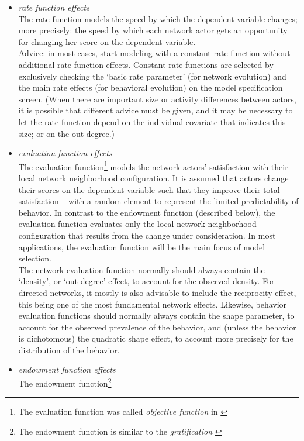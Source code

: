\documentclass[a4paper,fleqn]{article}
\newcommand{\+}{\, + \,}
\begin{document}
{\begin{itemize}
\item {\em rate function effects}\\
The rate function models the speed by which the dependent variable
changes; more precisely: the speed by which each network actor
gets an opportunity for changing her score on the dependent
variable.\\
Advice: in most cases, start modeling with a constant rate function without
additional rate function effects. Constant rate functions are
selected by exclusively checking the `basic rate parameter' (for
network evolution) and the main rate effects (for behavioral
evolution) on the {\sf model specification} screen.
(When there are important size or activity differences between
actors, it is possible that different advice must be given,
and it may be necessary to let the rate function
depend on the individual covariate that indicates this size;
or on the out-degree.)
\item {\em evaluation function effects}\\
The evaluation function\footnote{The evaluation function was called
\emph{objective function} in \citet{Snijders01}} models the network actors' satisfaction with their local
network neighborhood configuration. It is assumed that actors
change their scores on the dependent variable such that they
improve their total satisfaction -- with a random element
to represent the limited predictability of behavior.
In contrast to the endowment
function (described below), the evaluation function evaluates only
the local network neighborhood configuration that results from the
change under consideration.
In most applications, the evaluation function will
be the main focus of model selection.\\
The network evaluation function normally should always contain the
`density', or `out-degree' effect, to account for the observed
density. For directed networks,
it mostly is also advisable to include the reciprocity
effect, this being one of the most fundamental network effects.
Likewise, behavior evaluation functions should normally always
contain the shape parameter, to account for the observed
prevalence of the behavior, and
(unless the behavior is dichotomous) the quadratic shape effect,
to account more precisely for the distribution of the behavior.
\item {\em endowment function effects}\\
The endowment function\footnote{The endowment function is similar to the {\it gratification
}}
\end{itemize}}
\end{document}

